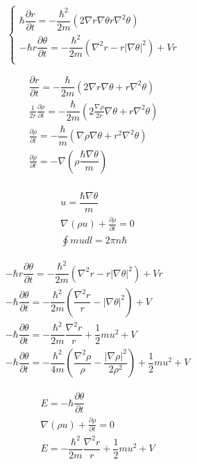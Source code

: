 \documentclass[11pt]{article}
\begin{document}
\begin{equation}
\begin{cases}
\hbar \dfrac{\partial r}{\partial t}  = - \dfrac{\hbar^2}{2m} (2\nabla r \nabla \theta  r \nabla^2 \theta) \\
- \hbar r \dfrac{\partial \theta}{\partial t} = - \dfrac{\hbar^2}{2m} (\nabla ^2 r  - r | \nabla \theta |^2 ) + V r \\
\end{cases}
\end{equation}

\begin{equation}
\begin{aligned}
\dfrac{\partial r}{\partial t}  = - \dfrac{\hbar}{2m} (2\nabla r \nabla \theta + r \nabla^2 \theta) \\
\frac{1}{2r} \frac{\partial \rho}{\partial t} = - \dfrac{\hbar}{2m} (2\frac{\nabla \rho}{2r}\nabla \theta + r \nabla^2 \theta) \\
\frac{\partial \rho}{\partial t} = - \dfrac{\hbar}{m} (\nabla \rho \nabla \theta + r^2 \nabla^2 \theta) \\
\frac{\partial \rho}{\partial t} = - \nabla \left( \rho  \dfrac{\hbar \nabla \theta}{m}\right) \\
\end{aligned}
\end{equation}

\begin{equation}
\begin{aligned}
& u = \dfrac{\hbar \nabla \theta}{m} \\
& \nabla \left( \rho  u\right) + \frac{\partial \rho}{\partial t} = 0\\
& \oint mu dl = 2\pi n \hbar
\end{aligned}
\end{equation}

\begin{equation}
\begin{aligned}
& - \hbar r \dfrac{\partial \theta}{\partial t} = - \dfrac{\hbar^2}{2m} (\nabla ^2 r  - r | \nabla \theta |^2 ) + V r \\
& - \hbar \dfrac{\partial \theta}{\partial t} = - \dfrac{\hbar^2}{2m} \left(\dfrac{\nabla ^2 r}{r}  -  | \nabla \theta |^2 \right) + V \\
& - \hbar \dfrac{\partial \theta}{\partial t} = - \dfrac{\hbar^2}{2m} \dfrac{\nabla ^2 r}{r}  + \dfrac{1}{2} m u^2 + V \\
& - \hbar \dfrac{\partial \theta}{\partial t} = - \dfrac{\hbar^2}{4m} \left( \dfrac{\nabla ^2 \rho}{\rho} - \dfrac{|\nabla  \rho|^2}{2\rho^2} \right)  + \dfrac{1}{2} m u^2 + V
\end{aligned}
\end{equation}

\begin{equation}
\begin{aligned}
& E = - \hbar \dfrac{\partial \theta}{\partial t} \\
& \nabla \left( \rho  u\right) + \frac{\partial \rho}{\partial t} = 0\\
& E = - \dfrac{\hbar^2}{2m} \dfrac{\nabla ^2 r}{r}  + \dfrac{1}{2} m u^2 + V
\end{aligned}
\end{equation}

	
\end{document}
